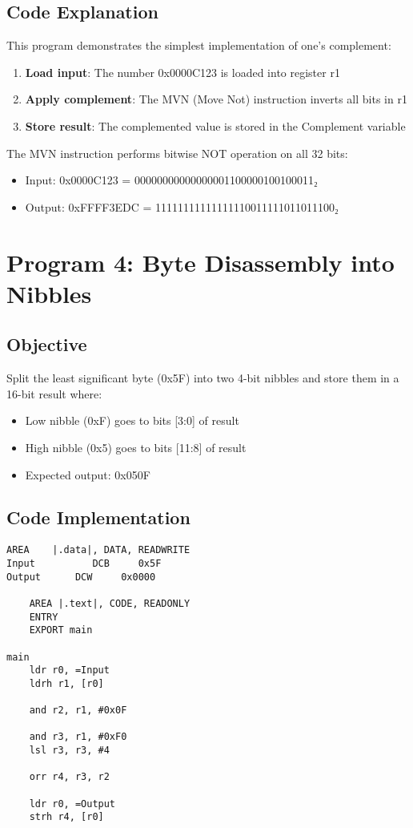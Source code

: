 \documentclass[12pt,a4paper]{article}
\begin{document}
\subsection{Code Explanation}

This program demonstrates the simplest implementation of one's complement:

\begin{enumerate}
    \item \textbf{Load input}: The number 0x0000C123 is loaded into register r1
    \item \textbf{Apply complement}: The MVN (Move Not) instruction inverts all bits in r1
    \item \textbf{Store result}: The complemented value is stored in the Complement variable
\end{enumerate}

The MVN instruction performs bitwise NOT operation on all 32 bits:
\begin{itemize}
    \item Input: 0x0000C123 = 00000000000000001100000100100011₂
    \item Output: 0xFFFF3EDC = 11111111111111110011111011011100₂
\end{itemize}

\newpage
\section{Program 4: Byte Disassembly into Nibbles}

\subsection{Objective}
Split the least significant byte (0x5F) into two 4-bit nibbles and store them in a 16-bit result where:
\begin{itemize}
    \item Low nibble (0xF) goes to bits [3:0] of result
    \item High nibble (0x5) goes to bits [11:8] of result
    \item Expected output: 0x050F
\end{itemize}

\subsection{Code Implementation}

\begin{lstlisting}[style=assembly, caption=Nibble Disassembly Implementation]
    AREA    |.data|, DATA, READWRITE
Input          DCB     0x5F
Output      DCW     0x0000

    AREA |.text|, CODE, READONLY
    ENTRY
    EXPORT main

main
    ldr r0, =Input
    ldrh r1, [r0]

    and r2, r1, #0x0F   
    
    and r3, r1, #0xF0
    lsl r3, r3, #4
        
    orr r4, r3, r2     

    ldr r0, =Output
    strh r4, [r0]      
\end{lstlisting}
\end{document}
